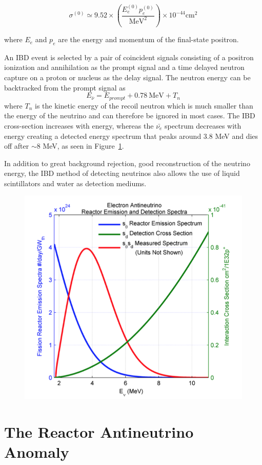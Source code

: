 \begin{equation}
	\sigma^{(0)} \simeq 9.52 \times \left(\frac{E_e^{(0)}p_e^{(0)}}{\textrm{MeV}^2}\right) \times 10^{-44}\textrm{cm}^2
\end{equation}

where $E_e$ and $p_e$ are the energy and momentum of the final-state positron. 

An IBD event is selected by a pair of coincident signals consisting of a positron ionization and annihilation as the prompt signal and a time delayed neutron capture on a proton or nucleus as the delay signal. 
The neutron energy can be backtracked from the prompt signal as
\begin{equation}	
	E_{\bar{\nu}} = E_{prompt} + 0.78~\textrm{MeV} + T_n
\end{equation}
where $T_n$ is the kinetic energy of the recoil neutron which is much smaller than the energy of the neutrino and can therefore be ignored in most cases. 
The IBD cross-section increases with energy, whereas the $\bar{\nu_{e}}$ spectrum decreases with energy creating a detected energy spectrum that peaks around 3.8 MeV  and dies off after $\sim$8 MeV, as seen in Figure~\ref{fig:ibdspectrum}. 

In addition to great background rejection, good reconstruction of the neutrino energy, the IBD method of detecting neutrinos also allows the use of liquid scintillators and water as detection mediums. 

\begin{figure}[h]
	\centering
	\includegraphics[width=0.6\linewidth]{tex/3-reactorneutrinos-images/IBDSpectrum}
	\caption{}
	\label{fig:ibdspectrum}
\end{figure}



\section{The Reactor Antineutrino Anomaly}







